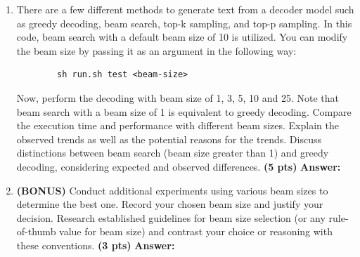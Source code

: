 \documentclass{assignment format}
\newenvironment{answer}{
    {\bf Answer:} \begingroup\color{red}
}{\endgroup}%
\begin{document}
\begin{enumerate}[label=(\alph*)]
    \item There are a few different methods to generate text from a decoder model such as greedy decoding, beam search, top-k sampling, and top-p sampling. In this code, beam search with a default beam size of 10 is utilized. You can modify the beam size by passing it as an argument in the following way: 
    \begin{verbatim}
        sh run.sh test <beam-size>
    \end{verbatim}
     Now, perform the decoding with beam size of 1, 3, 5, 10 and 25. Note that beam search with a beam size of 1 is equivalent to greedy decoding. Compare the execution time and performance with different beam sizes. Explain the observed trends as well as the potential reasons for the trends.  Discuss distinctions between beam search (beam size greater than 1) and greedy decoding, considering expected and observed differences.
     \textbf{(5 pts)}
        \begin{answer} 
        \end{answer}  
    \item \textbf{(BONUS)} Conduct additional experiments using various beam sizes to determine the best one. Record your chosen beam size and justify your decision. Research established guidelines for beam size selection (or any rule-of-thumb value for beam size) and contrast your choice or reasoning with these conventions.
     \textbf{(3 pts)}
        \begin{answer} 
        \end{answer}  
\end{enumerate}
\end{document}

